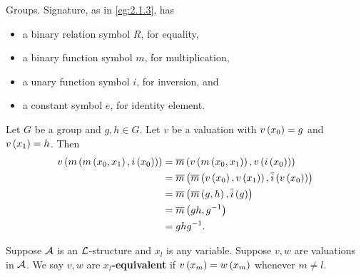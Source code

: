 \begin{example2}
Groups. Signature, as in \ref{eg:2.1.3}, has
\begin{itemize}
\item a binary relation symbol $ R $, for equality,
\item a binary function symbol $ m $, for multiplication,
\item a unary function symbol $ i $, for inversion, and
\item a constant symbol $ e $, for identity element.
\end{itemize}
Let $ G $ be a group and $ g, h \in G $. Let $ v $ be a valuation with $ v\rb{x_0} = g $ and $ v\rb{x_1} = h $. Then
\begin{align*}
v\rb{m\rb{m\rb{x_0, x_1}, i\rb{x_0}}}
& = \overline{m}\rb{v\rb{m\rb{x_0, x_1}}, v\rb{i\rb{x_0}}} \\
& = \overline{m}\rb{\overline{m}\rb{v\rb{x_0}, v\rb{x_1}}, \overline{i}\rb{v\rb{x_0}}} \\
& = \overline{m}\rb{\overline{m}\rb{g, h}, \overline{i}\rb{g}} \\
& = \overline{m}\rb{gh, g^{-1}} \\
& = ghg^{-1}.
\end{align*}
\end{example2}

\begin{definition}
Suppose $ \AA $ is an $ \LL $-structure and $ x_l $ is any variable. Suppose $ v, w $ are valuations in $ \AA $. We say $ v, w $ are \textbf{$ x_l $-equivalent} if $ v\rb{x_m} = w\rb{x_m} $ whenever $ m \ne l $.
\end{definition}

\pagebreak

